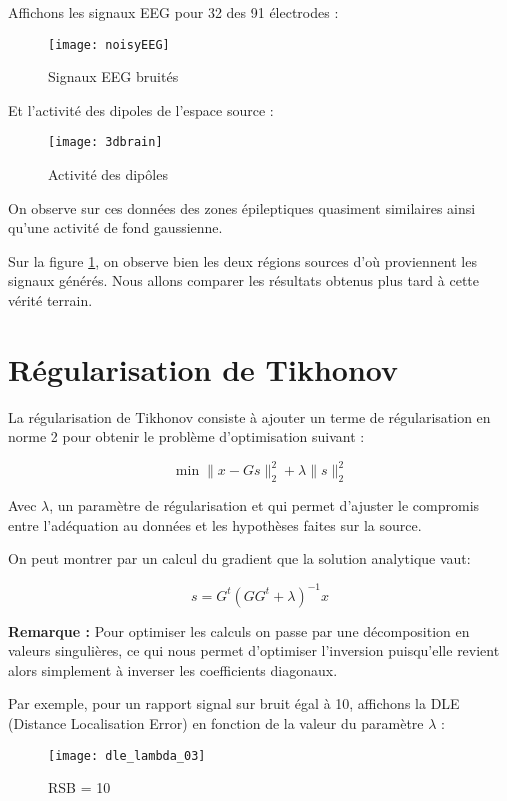 \documentclass[12pt,a4paper,titlepage]{article}
\begin{document}
Affichons les signaux EEG pour 32 des 91 électrodes :

\begin{figure}[H]
    \caption{Signaux EEG bruités}
    \texttt{[image: noisyEEG]}
    \centering
\end{figure}

Et l'activité des dipoles de l'espace source :

\begin{figure}[H]
    \caption{Activité des dipôles}
    \label{brain}
    \texttt{[image: 3dbrain]}
    \centering
\end{figure}

On observe sur ces données des zones épileptiques quasiment similaires
ainsi qu'une activité de fond gaussienne.

Sur la figure \ref{brain}, on observe bien les deux régions sources
d'où proviennent les signaux générés. Nous allons comparer les résultats
obtenus plus tard à cette vérité terrain.

\section{Régularisation de Tikhonov}

La régularisation de Tikhonov consiste à ajouter un terme de régularisation
en norme 2 pour obtenir le problème d'optimisation suivant :

$$ \min \lVert x - Gs \rVert^2_2 + \lambda \lVert s \rVert^2_2 $$

Avec $\lambda$, un paramètre de régularisation et qui permet d'ajuster
le compromis entre l'adéquation au données et les hypothèses faites sur
la source.

On peut montrer par un calcul du gradient que la solution analytique vaut:

$$ s = G^t(GG^t + \lambda)^{-1}x $$

\textbf{Remarque :} Pour optimiser les calculs on passe par une décomposition en valeurs singulières,
ce qui nous permet d'optimiser l'inversion puisqu'elle revient alors simplement
à inverser les coefficients diagonaux.

Par exemple, pour un rapport signal sur bruit égal à 10, affichons la
DLE (Distance Localisation Error)  en fonction de la valeur du
paramètre $\lambda$ :

\begin{figure}[H]
    \caption{RSB = 10}
    \label{lambdas}
    \texttt{[image: dle\_lambda\_03]}
    \centering
\end{figure}
\end{document}
